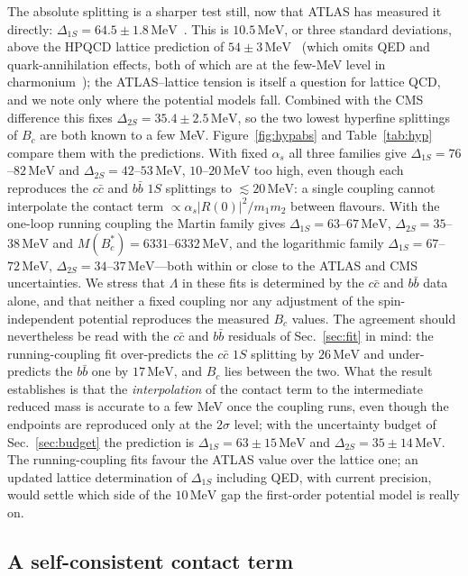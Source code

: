 \documentclass[10pt,twocolumn]{article}
\newcommand{\Bc}{B_c}
\newcommand{\Bcs}{B_c^*}
\newcommand{\cc}{c\bar c}
\newcommand{\bb}{b\bar b}
\newcommand{\MeV}{\,\mathrm{MeV}}
\begin{document}
The absolute splitting is a sharper test still, now that ATLAS has measured it directly: $\Delta_{1S}=64.5\pm1.8\MeV$~\cite{ATLAS2026}.
This is $10.5\MeV$, or three standard deviations, above the HPQCD lattice prediction of $54\pm3\MeV$~\cite{Dowdall2012} (which omits QED and quark-annihilation effects, both of which are at the few-MeV level in charmonium~\cite{Hatton2020}); the ATLAS--lattice tension is itself a question for lattice QCD, and we note only where the potential models fall.
Combined with the CMS difference this fixes $\Delta_{2S}=35.4\pm2.5\MeV$, so the two lowest hyperfine splittings of $\Bc$ are both known to a few MeV.
Figure~\ref{fig:hypabs} and Table~\ref{tab:hyp} compare them with the predictions.
With fixed $\alpha_s$ all three families give $\Delta_{1S}=76$--$82\MeV$ and $\Delta_{2S}=42$--$53\MeV$, $10$--$20\MeV$ too high, even though each reproduces the $\cc$ and $\bb$ $1S$ splittings to $\lesssim20\MeV$: a single coupling cannot interpolate the contact term $\propto\alpha_s|R(0)|^2/m_1m_2$ between flavours.
With the one-loop running coupling the Martin family gives $\Delta_{1S}=63$--$67\MeV$, $\Delta_{2S}=35$--$38\MeV$ and $M(\Bcs)=6331$--$6332\MeV$, and the logarithmic family $\Delta_{1S}=67$--$72\MeV$, $\Delta_{2S}=34$--$37\MeV$---both within or close to the ATLAS and CMS uncertainties.
We stress that $\Lambda$ in these fits is determined by the $\cc$ and $\bb$ data alone, and that neither a fixed coupling nor any adjustment of the spin-independent potential reproduces the measured $\Bc$ values.
The agreement should nevertheless be read with the $\cc$ and $\bb$ residuals of Sec.~\ref{sec:fit} in mind: the running-coupling fit over-predicts the $\cc$ $1S$ splitting by $26\MeV$ and under-predicts the $\bb$ one by $17\MeV$, and $\Bc$ lies between the two.
What the result establishes is that the \emph{interpolation} of the contact term to the intermediate reduced mass is accurate to a few MeV once the coupling runs, even though the endpoints are reproduced only at the $2\sigma$ level; with the uncertainty budget of Sec.~\ref{sec:budget} the prediction is $\Delta_{1S}=63\pm15\MeV$ and $\Delta_{2S}=35\pm14\MeV$.
The running-coupling fits favour the ATLAS value over the lattice one; an updated lattice determination of $\Delta_{1S}$ including QED, with current precision, would settle which side of the $10\MeV$ gap the first-order potential model is really on.

\subsection{A self-consistent contact term}
\label{sec:sc}
\end{document}
